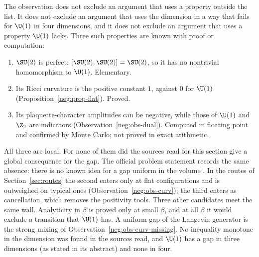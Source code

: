 The observation does not exclude an argument that uses a property outside the list. It does
not exclude an argument that uses the dimension in a way that fails for $\U(1)$ in four
dimensions, and it does not exclude an argument that uses a property $\U(1)$ lacks. Three such
properties are known with proof or computation:
\begin{enumerate}
\item $\SU(2)$ is perfect: $[\SU(2),\SU(2)]=\SU(2)$, so it has no nontrivial homomorphism to
$\U(1)$. Elementary.
\item Its Ricci curvature is the positive constant $1$, against $0$ for $\U(1)$
(Proposition~\ref{neg:prop-flat}). Proved.
\item Its plaquette-character amplitudes can be negative, while those of $\U(1)$ and $\Z_2$ are
indicators (Observation~\ref{neg:obs-dual}). Computed in floating point and confirmed by Monte
Carlo; not proved in exact arithmetic.
\end{enumerate}
All three are local. For none of them did the sources read for this section give a global
consequence for the gap. The official problem
statement records the same absence: there is no known idea for a gap uniform in the volume
\cite{JW}. In the routes of
Section~\ref{sec:routes} the second enters only at flat configurations and is outweighed on
typical ones (Observation~\ref{neg:obs-curv}); the third enters as cancellation, which removes
the positivity tools. Three other candidates meet the same wall. Analyticity in $\beta$ is
proved only at small $\beta$, and at all $\beta$ it would exclude a transition that $\U(1)$ has.
A uniform gap of the Langevin generator is the strong mixing of
Observation~\ref{neg:obs-curv-missing}. No inequality monotone in the dimension was found in the
sources read, and
$\U(1)$ has a gap in three dimensions \cite{GM82} (as stated in its abstract) and none in four.


